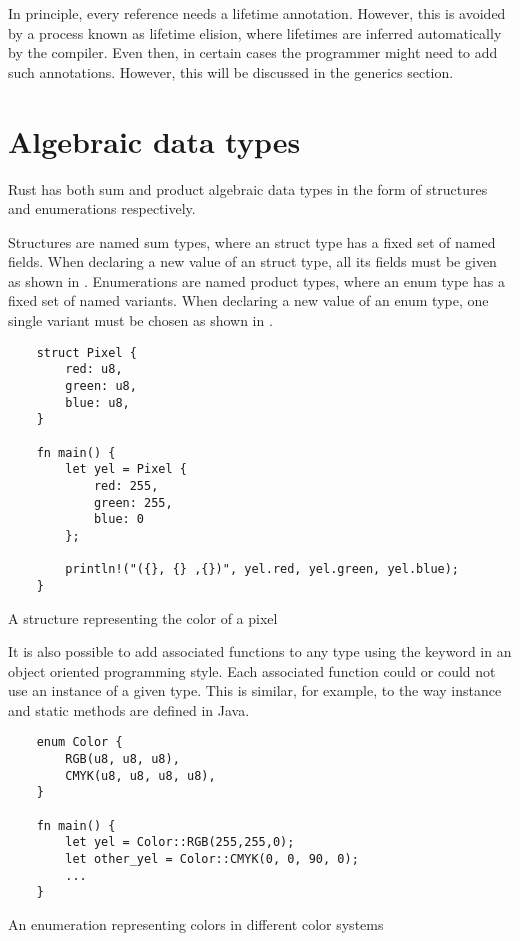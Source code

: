 In principle, every reference needs a lifetime annotation. However, this is
avoided by a process known as lifetime elision, where lifetimes are inferred
automatically by the compiler. Even then, in certain cases the programmer might
need to add such annotations. However, this will be discussed in the generics
section.

\section{Algebraic data types}

Rust has both sum and product algebraic data types in the form of structures and
enumerations respectively.

Structures are named sum types, where an struct type has a fixed set of named
fields. When declaring a new value of an struct type, all its fields must be
given as shown in . Enumerations are named product types, where
an enum type has a fixed set of named variants. When declaring a new value of an
enum type, one single variant must be chosen as shown in .

\begin{listing}[ht]
	\begin{verbatim}
    struct Pixel {
        red: u8,
        green: u8,
        blue: u8,
    }

    fn main() {
        let yel = Pixel {
            red: 255,
            green: 255,
            blue: 0
        };

        println!("({}, {} ,{})", yel.red, yel.green, yel.blue);
    }
    \end{verbatim}
  \caption{A structure representing the color of a pixel}
  \label{lst:struct}
\end{listing}

It is also possible to add associated functions to any type using the
 keyword in an object oriented programming style. Each associated
function could or could not use an instance of a given type. This is similar,
for example, to the way instance and static methods are defined in Java.

\begin{listing}[ht]
	\begin{verbatim}
    enum Color {
        RGB(u8, u8, u8),
        CMYK(u8, u8, u8, u8),
    }

    fn main() {
        let yel = Color::RGB(255,255,0);
        let other_yel = Color::CMYK(0, 0, 90, 0);
        ...
    }
    \end{verbatim}
  \caption{An enumeration representing colors in different color systems}
  \label{lst:enum}
\end{listing}

